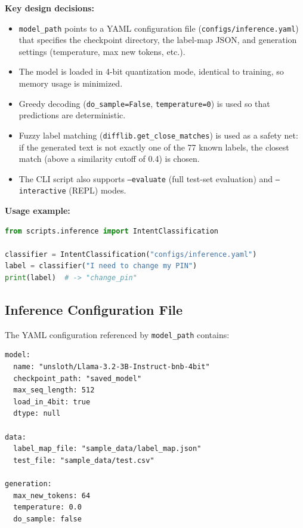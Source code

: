 \documentclass[12pt,a4paper]{article}
\begin{document}
\textbf{Key design decisions:}
\begin{itemize}[noitemsep]
    \item \texttt{model\_path} points to a YAML configuration file
          (\texttt{configs/inference.yaml}) that specifies the checkpoint
          directory, the label-map JSON, and generation settings (temperature,
          max new tokens, etc.).
    \item The model is loaded in 4-bit quantization mode, identical to
          training, so memory usage is minimized.
    \item Greedy decoding (\texttt{do\_sample=False}, \texttt{temperature=0})
          is used so that predictions are deterministic.
    \item Fuzzy label matching (\texttt{difflib.get\_close\_matches}) is used
          as a safety net: if the generated text is not exactly one of the 77
          known labels, the closest match (above a similarity cutoff of 0.4)
          is chosen.
    \item The CLI script also supports \texttt{--evaluate} (full test-set
          evaluation) and \texttt{--interactive} (REPL) modes.
\end{itemize}

\textbf{Usage example:}
\begin{lstlisting}[language=Python, caption={Programmatic usage of the IntentClassification class.}]
from scripts.inference import IntentClassification

classifier = IntentClassification("configs/inference.yaml")
label = classifier("I need to change my PIN")
print(label)  # -> "change_pin"
\end{lstlisting}

\subsection{Inference Configuration File}

The YAML configuration referenced by \texttt{model\_path} contains:

\begin{lstlisting}[language={},caption={\texttt{configs/inference.yaml}}]
model:
  name: "unsloth/Llama-3.2-3B-Instruct-bnb-4bit"
  checkpoint_path: "saved_model"
  max_seq_length: 512
  load_in_4bit: true
  dtype: null

data:
  label_map_file: "sample_data/label_map.json"
  test_file: "sample_data/test.csv"

generation:
  max_new_tokens: 64
  temperature: 0.0
  do_sample: false
\end{lstlisting}
\end{document}
